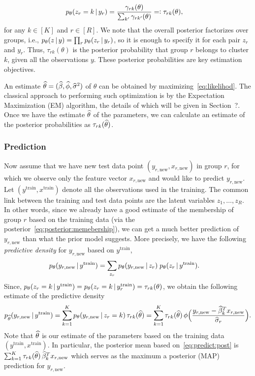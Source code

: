\documentclass[12pt]{article}
\begin{document}
\begin{align}\label{eq:posterior:memebership}
	p_\theta(z_r = k \,|\, y_r) = \frac{\gamma_{rk}(\theta)}{\sum_{k'} \gamma_{rk'}(\theta)} =: \tau_{rk}(\theta), \quad 
\end{align}
for any $k \in [K]$ and $r \in [R]$. 
We note that the overall posterior factorizes over groups, i.e., $p_\theta(z \,|\, y) = \prod_{r} p_\theta(z_r \,|\, y_r)$, so it is enough to specify it for each pair $z_r$ and $y_r$. Thus, $\tau_{rk}(\theta)$ is the posterior probability that group $r$ belongs to cluster $k$, given all the observations $y$. These posterior probabilities are  key estimation objectives. 

%
An estimate  $\widehat\theta = (\widehat \beta, \widehat\phi, \widehat \sigma^2)$ of $\theta$ can be obtained by maximizing~\eqref{eq:likelihod}. The classical approach to performing such optimization is by the Expectation Maximization (EM) algorithm, the details of which will be given in Section~?. Once we  have the estimate $\widehat\theta$ of the parameters, we can calculate an estimate of the posterior probabilities as $\tau_{rk}(\widehat\theta)$. 

\newcommand{\xnew}[1]{x_{#1,\text{new}}}
\newcommand{\ynew}[1]{y_{#1,\text{new}}}
\newcommand{\xtr}{x^{\text{train}}}
\newcommand{\ytr}{y^{\text{train}}}
\subsubsection{Prediction}
Now assume that we have new test data point $(\ynew{r},\xnew{r})$ in group $r$, for which we observe only the feature vector $\xnew{r}$ and would like to predict $\ynew{r}$. Let $(\ytr,\xtr)$ denote all the observations used in the training. The common link between the training and test data points are the latent variables $z_1,\dots,z_R$. In other words, since  we already have a good estimate of the membership of group $r$ based on the training data (via the posterior~\eqref{eq:posterior:memebership}), we can get a much better prediction of $\ynew{r}$ than what the prior model suggests. 
More precisely, we have the following \emph{predictive density} for $\ynew{r}$ based on $\ytr$,
\begin{align*}
	p_\theta(\ynew{r} \cond \ytr) &= \sum_{z_r} p_\theta(\ynew{r} \cond z_r) \;p_\theta(z_r \cond \ytr).
\end{align*}
Since, $p_\theta(z_r = k \cond \ytr) = p_\theta(z_r = k \cond \ytr_r) =\tau_{rk}(\theta)$, we obtain the following estimate of the predictive density
\begin{align}\label{eq:predict:post}
	p_{\thh}(\ynew{r} \cond \ytr)
	 = \sum_{k=1}^K p_\theta(\ynew{r}\cond z_r=k)\, \tau_{rk}(\thh) 
	=  \sum_{k=1}^K  \tau_{rk}(\thh) \,\phi\Big( \frac{\ynew{r} - \beh_k^T \xnew{r}}{\sigh_r} \Big).
\end{align}
Note that $\widehat\theta$ is our estimate of the parameters based on the training data  $(\ytr,\xtr)$.
In particular, the posterior mean based on~\eqref{eq:predict:post} is $\sum_{k=1}^K \tau_{rk}(\thh) \, \beh_k^T \xnew{r}$ which serves as the maximum a posterior (MAP) prediction for $\ynew{r}$.
\end{document}
